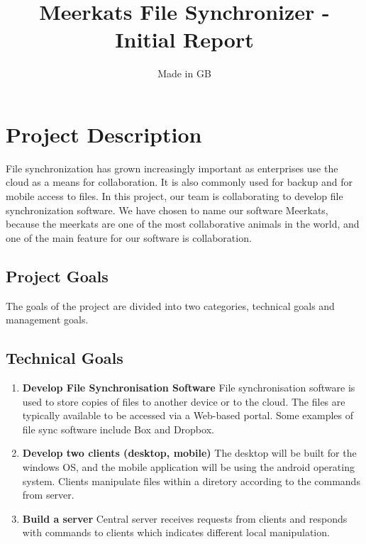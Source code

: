 \documentclass{article}
\title{Meerkats File Synchronizer - Initial Report}
\author{Made in GB}
\date{}
\begin{document}
\maketitle{}


\section{Project Description}

File synchronization has grown increasingly important as enterprises use the cloud as a means for collaboration. It is also commonly used for backup and for mobile access to files. In this project, our team is collaborating to develop file synchronization software. We have chosen to name our software Meerkats, because the meerkats are one of the most collaborative animals in the world, and one of the main feature for our software is collaboration.

\subsection{Project Goals}
The goals of the project are divided into two categories, technical goals and management goals.

\subsection{Technical Goals}

\begin{enumerate}
  \item \textbf{Develop File Synchronisation Software} File synchronisation software is used to store copies of files to another device or to the cloud. The files are typically available to be accessed via a Web-based portal. Some examples of file sync software include Box and Dropbox.
  \item \textbf{Develop two clients (desktop, mobile)} The desktop will be built for the windows OS, and the mobile application will be using the android operating system. Clients manipulate files within a diretory according to the commands from server.
  \item \textbf{Build a server} Central server receives requests from clients and responds with commands to clients which indicates different local manipulation.

\end{enumerate}
\end{document}
